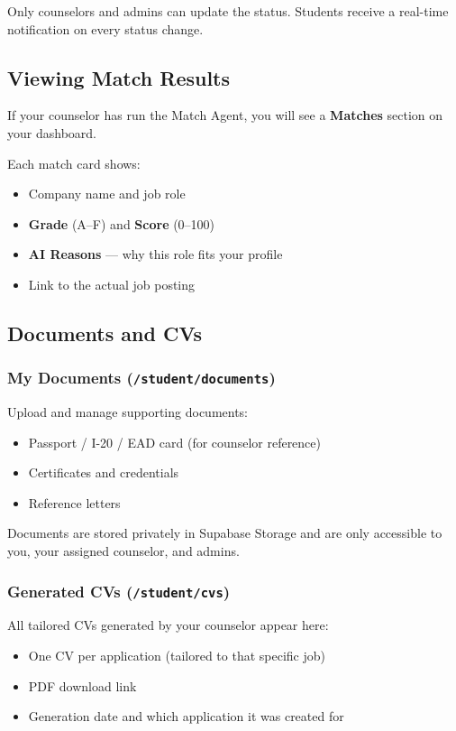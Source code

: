 \documentclass[11pt, a4paper]{article}
\newcommand{\nav}[1]{\textbf{\textcolor{accent}{#1}}}
\begin{document}
Only counselors and admins can update the status. Students receive a real-time notification on every status change.

\subsection{Viewing Match Results}

If your counselor has run the Match Agent, you will see a \nav{Matches} section on your dashboard.

Each match card shows:
\begin{itemize}
  \item Company name and job role
  \item \textbf{Grade} (A--F) and \textbf{Score} (0--100)
  \item \textbf{AI Reasons} — why this role fits your profile
  \item Link to the actual job posting
\end{itemize}

\subsection{Documents and CVs}

\subsubsection{My Documents (\texttt{/student/documents})}

Upload and manage supporting documents:
\begin{itemize}
  \item Passport / I-20 / EAD card (for counselor reference)
  \item Certificates and credentials
  \item Reference letters
\end{itemize}

Documents are stored privately in Supabase Storage and are only accessible to you, your assigned counselor, and admins.

\subsubsection{Generated CVs (\texttt{/student/cvs})}

All tailored CVs generated by your counselor appear here:
\begin{itemize}
  \item One CV per application (tailored to that specific job)
  \item PDF download link
  \item Generation date and which application it was created for
\end{itemize}
\end{document}
